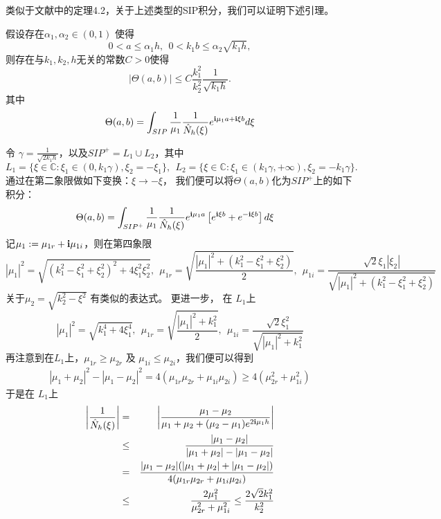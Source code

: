 类似于文献\cite{ch_cw}中的定理4.2，关于上述类型的SIP积分，我们可以证明下述引理。
\begin{lemma}\label{SIP_estimate}
假设存在$\alpha_1,\alpha_2\in(0,1)$ 使得
\begin{equation}
  0<a\leq\alpha_1h,\ \ 0<k_1b\leq\alpha_2\sqrt{k_1h},
\end{equation}
 则存在与$k_1,k_2,h$无关的常数$C>0$使得
\begin{equation}
    |\Theta(a,b)|\leq C\frac{k_1^2}{k_2^2}\frac{1}{\sqrt{k_1h}}.
\end{equation}
其中
\begin{eqnarray}
 \Theta(a,b)=\int_{SIP}\frac{1}{\mu_1}\frac{1}{\hat N_h(\xi)}e^{\mathbf{i}\mu_1a+\mathbf{i}\xi b}d\xi
\end{eqnarray}
\end{lemma}
\debproof
令 $\gamma=\frac{1}{\sqrt{2k_1h}}$，以及$SIP^+=L_1\cup L_2$，其中
$$
 L_1=\{\xi\in\mathbb{C}: \xi_1\in(0,k_1\gamma), \xi_2=-\xi_1\},\ \
 L_2=\{\xi\in\mathbb{C}: \xi_1\in(k_1\gamma,+\infty), \xi_2=-k_1\gamma\}
.$$
通过在第二象限做如下变换：$\xi\rightarrow-\xi$， 我们便可以将$\Theta(a,b)$化为$SIP^+$上的如下积分：
\begin{equation}
\Theta(a,b)=\int_{SIP^+} \frac{1}{\mu_1}\frac{1}{\hat N_h(\xi)}
e^{\mathbf{i}\mu_1a}\left[e^{\mathbf{i}\xi b}+e^{-\mathbf{i}\xi b}\right]d\xi\quad
\end{equation}
记$\mu_1:=\mu_{1r}+\mathbf{i}\mu_{1i}$，则在第四象限
$$
|\mu_1|^2=\sqrt{(k_1^2-\xi_1^2+\xi_2^2)^2+4\xi_1^2\xi_2^2},\ \ \mu_{1r}=\sqrt{\frac{|\mu_1|^2+(k_1^2-\xi_1^2+\xi_2^2)}{2}},\ \ \mu_{1i}=\frac{\sqrt{2}\xi_1|\xi_2|}{\sqrt{|\mu_1|^2+(k_1^2-\xi_1^2+\xi_2^2)}} $$
关于$\mu_2=\sqrt{k_2^2-\xi^2}$ 有类似的表达式。 更进一步， 在 $L_1$上
$$
|\mu_1|^2=\sqrt{k_1^4+4\xi_1^4},\ \
\mu_{1r}=\sqrt{\frac{|\mu_1|^2+k_1^2}{2}},\ \
\mu_{1i}=\frac{\sqrt{2}\xi_1^2}{\sqrt{|\mu_1|^2+k_1^2}}
$$
再注意到在$L_1$上，$\mu_{1r}\geq\mu_{2r}$ 及 $\mu_{1i}\leq\mu_{2i}$，我们便可以得到
\begin{eqnarray*}
|\mu_1+\mu_2|^2-|\mu_1-\mu_2|^2=4(\mu_{1r}\mu_{2r}+\mu_{1i}\mu_{2i})\geq4(\mu_{2r}^2+\mu_{1i}^2)
\end{eqnarray*}
于是在 $L_1$上
\begin{eqnarray*}
 \left|\frac{1}{\hat N_h(\xi)}\right|&=&\left|\frac{\mu_1-\mu_2}{\mu_1+\mu_2+(\mu_2-\mu_1)e^{2\mathbf{i}\mu_1h}}\right|\\
&\leq&\frac{|\mu_1-\mu_2|}{|\mu_1+\mu_2|-|\mu_1-\mu_2|}\\
&=&\frac{|\mu_1-\mu_2|(|\mu_1+\mu_2|+|\mu_1-\mu_2|)}{4(\mu_{1r}\mu_{2r}+\mu_{1i}\mu_{2i})}\\
&\leq&\frac{2\mu_1^2}{\mu_{2r}^2+\mu_{1i}^2}\leq \frac{2\sqrt2 k_1^2}{k_2^2}
\end{eqnarray*}
